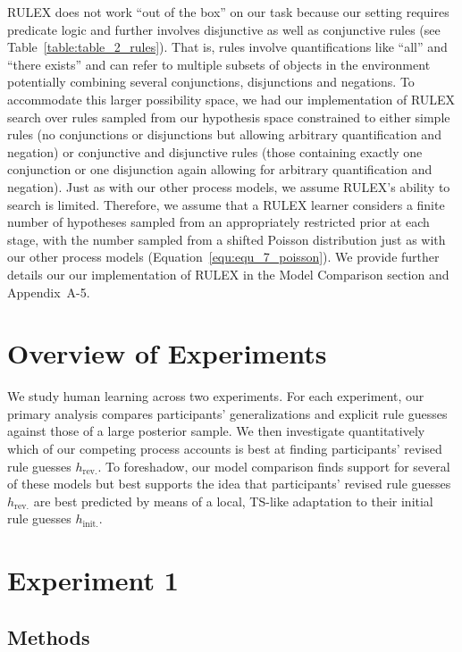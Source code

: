 \documentclass[doc,natbib,floatsintext]{apa7}
\newcommand{\hr}{h_{\mathrm{rev.}}}
\newcommand{\hi}{h_{\mathrm{init.}}}
\begin{document}
RULEX does not work ``out of the box'' on our task because our setting requires predicate logic and further involves disjunctive as well as conjunctive rules (see Table~\ref{table:table_2_rules}). That is, rules involve quantifications like ``all'' and ``there exists'' and can refer to multiple subsets of objects in the environment potentially combining several conjunctions, disjunctions and negations. To accommodate this larger possibility space, we had our implementation of RULEX search over rules sampled from our hypothesis space constrained to either simple rules (no conjunctions or disjunctions but allowing arbitrary quantification and negation) or conjunctive and disjunctive rules (those containing exactly one conjunction or one disjunction again allowing for arbitrary quantification and negation). Just as with our other process models, we assume RULEX's ability to search is limited. Therefore, we assume that a RULEX learner considers a finite number of hypotheses sampled from an appropriately restricted prior at each stage, with the number sampled from a shifted Poisson distribution just as with our other process models (Equation~\ref{equ:equ_7_poisson}). We provide further details our our implementation of RULEX in the Model Comparison section and Appendix~A-5. 

\section{Overview of Experiments}
We study human learning across two experiments. For each experiment, our primary analysis compares participants' generalizations and explicit rule guesses against those of a large posterior sample. We then investigate quantitatively which of our competing process accounts is best at finding participants' revised rule guesses $\hr$. To foreshadow, our model comparison finds support for several of these models but best supports the idea that participants' revised rule guesses $\hr$ are best predicted by means of a local, TS-like adaptation to their initial rule guesses $\hi$.

\section{Experiment 1}
\subsection{Methods}
\end{document}
